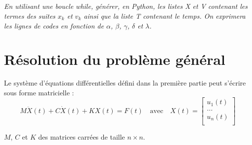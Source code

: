 \documentclass[10pt]{article}
\newif\ifprof
\begin{document}
\subparagraph{}
\textit{En utilisant une boucle \textsf{while}, générer, en Python, les listes \textsf{X} et \textsf{V} contenant les termes des suites $x_k$ et $v_k$ ainsi que la liste \textsf{T} contenant le temps. On exprimera les lignes de codes en fonction de $\alpha$, $\beta$, $\gamma$, $\delta$ et $\lambda$.}
\ifprof
\begin{corrige}
\begin{python}
t = 0
T,X,V = [t],[0],[0]
F = f_omega(Tsimu,h,fmax,fsign)
i=0
while t<Tsimu:
    t = t+h
    T.append(t)
    X.append(alpha*V[i]+beta*X[i])
    V.append(gamma*F[i]+delta*X[i]+lambd*V[i])    
    i=i+1

\end{python}
\end{corrige}
\else
\fi


\section{Résolution du problème général}
Le système d'équations différentielles défini dans la première partie peut s'écrire sous forme matricielle :
$$
M \ddot{X}(t) +C \dot{X}(t) +K {X}(t) = F(t) \quad \text{avec} \quad 
X(t)=\left[
\begin{array}{c} 
u_1(t) \\ 
... \\ 
u_n(t) \\
\end{array}\right]
$$

$M$, $C$ et $K$ des matrices carrées de taille $n\times n$.
\end{document}
